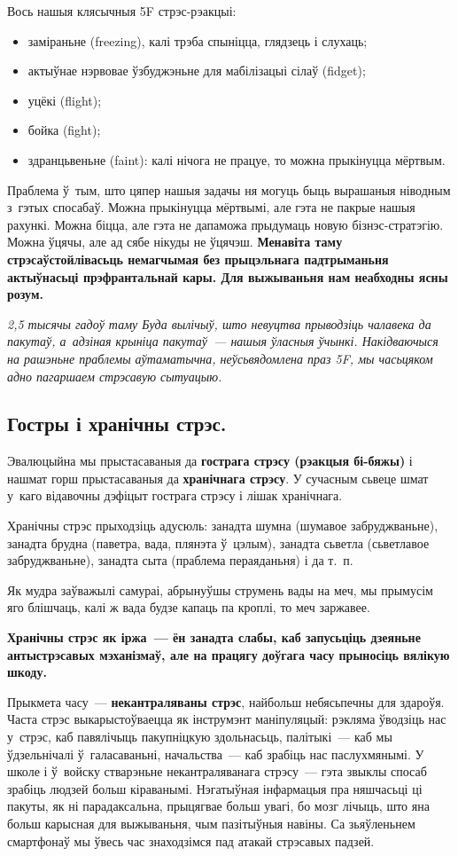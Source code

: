 Вось нашыя клясычныя 5F стрэс-рэакцыі: 
\begin{itemize}
  \item заміраньне (freezing), калі трэба спыніцца, глядзець і слухаць;
  \item актыўнае нэрвовае ўзбуджэньне для мабілізацыі сілаў (fidget);
  \item уцёкі (flight);
  \item бойка (fight);
  \item здранцьвеньне (faint): калі нічога не працуе, то можна прыкінуцца мёртвым.
\end{itemize}

Праблема ў~тым, што цяпер нашыя задачы ня могуць быць вырашаныя ніводным з~гэтых спосабаў. Можна прыкінуцца мёртвымі, але гэта не пакрые нашыя рахункі. Можна біцца, але гэта не дапаможа прыдумаць новую бізнэс-стратэгію. Можна ўцячы, але ад сябе нікуды не ўцячэш. \textbf{Менавіта таму стрэсаўстойлівасьць немагчымая без прыцэльнага падтрыманьня актыўнасьці прэфрантальнай кары. Для выжываньня нам неабходны ясны розум.}

\emph{2,5 тысячы гадоў таму Буда вылічыў, што невуцтва прыводзіць чалавека да пакутаў, а~адзіная крыніца пакутаў~--- нашыя ўласныя ўчынкі. Накідваючыся на рашэньне праблемы аўтаматычна, неўсьвядомлена праз 5F, мы часьцяком адно пагаршаем стрэсавую сытуацыю.}

\subsection*{Гостры і хранічны стрэс.}

Эвалюцыйна мы прыстасаваныя да \textbf{гострага стрэсу (рэакцыя бі-бяжы)} і нашмат горш прыстасаваныя да \textbf{хранічнага стрэсу}. У сучасным сьвеце шмат у~каго відавочны дэфіцыт гострага стрэсу і лішак хранічнага. 

Хранічны стрэс прыходзіць адусюль: занадта шумна (шумавое забруджваньне), занадта брудна (паветра, вада, плянэта ў~цэлым), занадта сьветла (сьветлавое забруджваньне), занадта сыта (праблема пераяданьня) і да т.~п.

Як мудра заўважылі самураі, абрынуўшы струмень вады на меч, мы прымусім яго блішчаць, калі ж вада будзе капаць па кроплі, то меч заржавее. 

\textbf{Хранічны стрэс як іржа~--- ён занадта слабы, каб запусьціць дзеяньне антыстрэсавых мэханізмаў, але на працягу доўгага часу прыносіць вялікую шкоду.}

Прыкмета часу~--- \textbf{некантраляваны стрэс}, найбольш небясьпечны для здароўя. Часта стрэс выкарыстоўваецца як інструмэнт маніпуляцый: рэкляма ўводзіць нас у~стрэс, каб павялічыць пакупніцкую здольнасьць, палітыкі~--- каб мы ўдзельнічалі ў~галасаваньні, начальства~--- каб зрабіць нас паслухмянымі. У школе і ў~войску стварэньне некантраляванага стрэсу~--- гэта звыклы спосаб зрабіць людзей больш кіраванымі. Нэгатыўная інфармацыя пра няшчасьці ці пакуты, як ні парадаксальна, прыцягвае больш увагі, бо мозг лічыць, што яна больш карысная для выжываньня, чым пазітыўныя навіны. Са зьяўленьнем смартфонаў мы ўвесь час знаходзімся пад атакай стрэсавых падзей.

